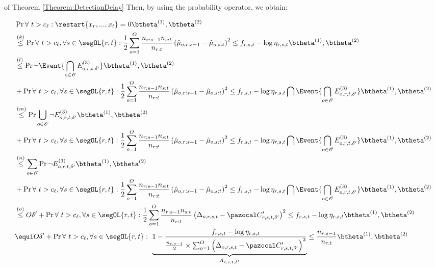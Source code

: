 \documentclass{article} %
\begin{document}
\begin{myproof}{of Theorem \ref{Theorem:DetectionDelay}}
Then, by using the probability operator, we obtain:

\begin{align*}
    &\Pr{ \forall\  t > c_\ell: \restart{x_r,...,x_t} = 0}{\btheta^{(1)},\btheta^{(2)}} \\
    &\overset{(k)}{\leq}  \Pr{ \forall\  t > c_\ell , \forall  s \in \segOL{r,t}: \frac{1}{2}  \sum_{o=1}^{O} \frac{n_{r:s-1}n_{s:t}}{n_{r:t}} \left( \hat{\mu}_{o,r:s-1} -\hat{\mu}_{o,s:t} \right)^2  \leq  f_{r,s,t} - \log \eta_{r,s,t} }{\btheta^{(1)},\btheta^{(2)}} \\ 
    & \overset{(l)}{\leq} \Pr{\neg \Event{ \bigcap_{o \in \mathcal{O}} E^{(3)}_{o,r,t,\delta^\prime}}}{\btheta^{(1)},\btheta^{(2)}} \\
    &+ \Pr{ \forall\  t > c_\ell , \forall  s \in \segOL{r,t}: \frac{1}{2}  \sum_{o=1}^{O} \frac{n_{r:s-1}n_{s:t}}{n_{r:t}} \left( \hat{\mu}_{o,r:s-1} -\hat{\mu}_{o,s:t} \right)^2  \leq  f_{r,s,t} - \log \eta_{r,s,t} \bigcap \Event{ \bigcap_{o \in \mathcal{O}} E^{(3)}_{o,r,t,\delta^\prime}} }{\btheta^{(1)},\btheta^{(2)}} \\
    & \overset{(m)}{\leq} \Pr{ \bigcup_{o \in \mathcal{O}} \neg E^{(3)}_{o,r,t,\delta^\prime}}{\btheta^{(1)},\btheta^{(2)}} \\
    &+ \Pr{ \forall\  t > c_\ell , \forall  s \in \segOL{r,t}: \frac{1}{2}  \sum_{o=1}^{O} \frac{n_{r:s-1}n_{s:t}}{n_{r:t}} \left( \hat{\mu}_{o,r:s-1} -\hat{\mu}_{o,s:t} \right)^2  \leq  f_{r,s,t} - \log \eta_{r,s,t} \bigcap \Event{ \bigcap_{o \in \mathcal{O}} E^{(3)}_{o,r,t,\delta^\prime}} }{\btheta^{(1)},\btheta^{(2)}} \\
    & \overset{(n)}{\leq} \sum_{o \in \mathcal{O}} \Pr{\neg E^{(3)}_{o,r,t,\delta^\prime}}{\btheta^{(1)},\btheta^{(2)}} \\
    &+ \Pr{ \forall\  t > c_\ell , \forall  s \in \segOL{r,t}: \frac{1}{2}  \sum_{o=1}^{O} \frac{n_{r:s-1}n_{s:t}}{n_{r:t}} \left( \hat{\mu}_{o,r:s-1} -\hat{\mu}_{o,s:t} \right)^2  \leq  f_{r,s,t} - \log \eta_{r,s,t} \bigcap \Event{ \bigcap_{o \in \mathcal{O}} E^{(3)}_{o,r,t,\delta^\prime}} }{\btheta^{(1)},\btheta^{(2)}} \\
    & \overset{(o)}{\leq} O\delta^\prime + \Pr{ \forall\  t > c_\ell , \forall  s \in \segOL{r,t}: \frac{1}{2}  \sum_{o=1}^{O} \frac{n_{r:s-1}n_{s:t}}{n_{r:t}} \left( \Delta_{o,r,s,t} - \pC^\prime_{r,s,t,\delta^\prime} \right)^2  \leq  f_{r,s,t} - \log \eta_{r,s,t} }{\btheta^{(1)},\btheta^{(2)}} \\
	& \equi O\delta^\prime +  \Pr{\forall\  t > c_\ell , \forall  s \in \segOL{r,t}: \ 
	\underbrace{1- \frac{f_{r,s,t} - \log \eta_{r,s,t}}{
	\frac{n_{r,s-1}}{2} \times \sum_{o=1}^{O} \left(\Delta_{o,r,s,t} - \pC^\prime_{r,s,t,\delta^\prime}  \right)^2}}_{A_{r,s,t, \delta^\prime}} \leq \frac{n_{r:s-1}}{n_{r:t}}}{\btheta^{(1)},\btheta^{(2)}}
\end{align*}



\end{myproof}
\end{document}

